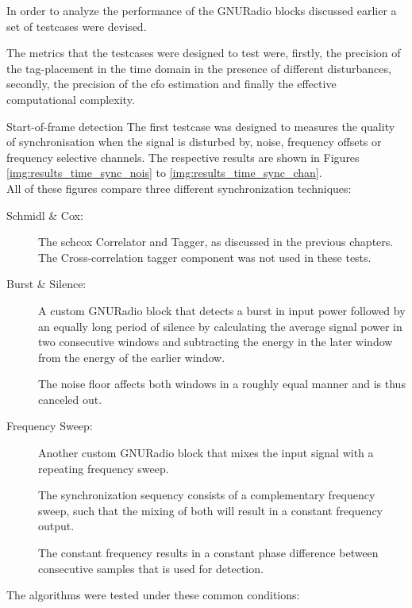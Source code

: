 In order to analyze the performance of the GNURadio blocks
discussed earlier a set of testcases were devised.

The metrics that the testcases were designed to test
were, firstly, the precision of the tag-placement in
the time domain in the presence of different disturbances,
secondly, the precision of the \gls{cfo} estimation
and finally the effective computational complexity.

\begin{subchapter}{Start-of-frame detection}
  The first testcase was designed to measures the quality
  of synchronisation when the signal is disturbed by,
  noise, frequency offsets or frequency selective channels.
  The respective results are shown in Figures \ref{img:results_time_sync_nois}
  to \ref{img:results_time_sync_chan}. \\

  \noindent All of these figures compare three different synchronization
  techniques:

  \begin{description}
    \item[Schmidl \& Cox:]
      The \acrlong{schcox} Correlator and Tagger, as discussed in the
      previous chapters.
      The Cross-correlation tagger component was not used in these tests.

    \item[Burst \& Silence:]
      A custom GNURadio block that detects a burst in input power
      followed by an equally long period of silence by calculating the
      average signal power in two consecutive windows and subtracting the
      energy in the later window from the energy of the earlier window.

      The noise floor affects both windows in a roughly equal manner
      and is thus canceled out.

    \item[Frequency Sweep:]
      Another custom GNURadio block that mixes the input signal
      with a repeating frequency sweep.

      The synchronization sequency consists of a complementary
      frequency sweep, such that the mixing of both will result
      in a constant frequency output.

      The constant frequency results in a constant phase difference
      between consecutive samples that is used for detection.
  \end{description}

  The algorithms were tested under these common conditions:


\end{subchapter}
